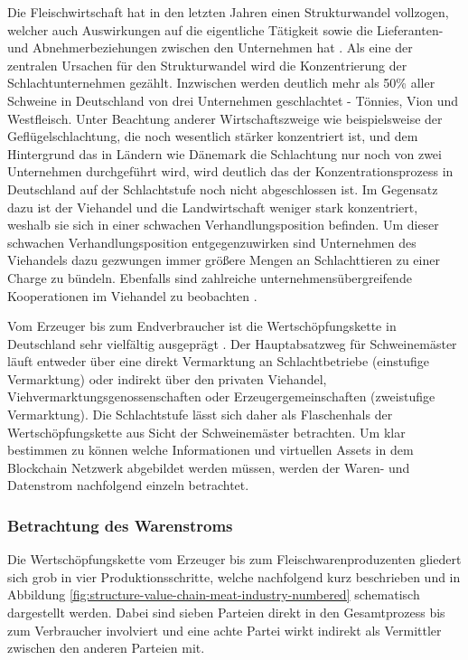 Die Fleischwirtschaft hat in den letzten Jahren einen Strukturwandel vollzogen, welcher auch Auswirkungen auf die eigentliche Tätigkeit sowie die Lieferanten- und Abnehmerbeziehungen zwischen den Unternehmen hat \citep{Nolte2006}. Als eine der zentralen Ursachen für den Strukturwandel wird die Konzentrierung der Schlachtunternehmen gezählt. Inzwischen werden deutlich mehr als 50\% aller Schweine in Deutschland von drei Unternehmen geschlachtet - Tönnies, Vion und Westfleisch. Unter Beachtung anderer Wirtschaftszweige wie beispielsweise der Geflügelschlachtung, die noch wesentlich stärker konzentriert ist, und dem Hintergrund das in Ländern wie Dänemark die Schlachtung nur noch von zwei Unternehmen durchgeführt wird, wird deutlich das der Konzentrationsprozess in Deutschland auf der Schlachtstufe noch nicht abgeschlossen ist. Im Gegensatz dazu ist der Viehandel und die Landwirtschaft weniger stark konzentriert, weshalb sie sich in einer schwachen Verhandlungsposition befinden. Um dieser schwachen Verhandlungsposition entgegenzuwirken sind Unternehmen des Viehandels dazu gezwungen immer größere Mengen an Schlachttieren zu einer Charge zu bündeln. Ebenfalls sind zahlreiche unternehmensübergreifende Kooperationen im Viehandel zu beobachten \citep{Voss2010}.

Vom Erzeuger bis zum Endverbraucher ist die Wertschöpfungskette in Deutschland sehr vielfältig ausgeprägt \citep{Freund1997}. Der Hauptabsatzweg für Schweinemäster läuft entweder über eine direkt Vermarktung an Schlachtbetriebe (einstufige Vermarktung) oder indirekt über den privaten Viehandel, Viehvermarktungsgenossenschaften oder Erzeugergemeinschaften (zweistufige Vermarktung). Die Schlachtstufe lässt sich daher als Flaschenhals der Wertschöpfungskette aus Sicht der Schweinemäster betrachten. Um klar bestimmen zu können welche Informationen und virtuellen Assets in dem Blockchain Netzwerk abgebildet werden müssen, werden der Waren- und Datenstrom nachfolgend einzeln betrachtet.

\subsubsection{Betrachtung des Warenstroms}

Die Wertschöpfungskette vom Erzeuger bis zum Fleischwarenproduzenten gliedert sich grob in vier Produktionsschritte, welche nachfolgend kurz beschrieben und in Abbildung \ref{fig:structure-value-chain-meat-industry-numbered} schematisch dargestellt werden. Dabei sind sieben Parteien direkt in den Gesamtprozess bis zum Verbraucher involviert und eine achte Partei wirkt indirekt als Vermittler zwischen den anderen Parteien mit.

